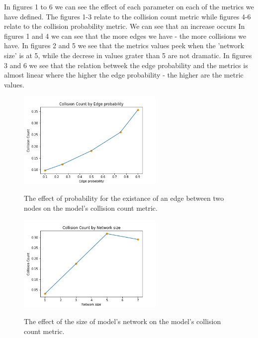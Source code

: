 \documentclass{article}
\begin{document}
In figures 1 to 6 we can see the effect of each parameter on each of the metrics we have defined.
The figures 1-3 relate to the collision count metric while figures 4-6 relate to the collision probability metric.
We can see that an increase occurs In figures 1 and 4 we can see that the more edges we have - the more collisions we have.
In figures 2 and 5 we see that the metrics values peek when the 'network size' is at 5,
while the decrese in values grater than 5 are not dramatic.
In figures 3 and 6 we see that the relation betweek the edge probability and the metrics is almost linear where the
higher the edge probability - the higher are the metric values.

\begin{figure}
    \begin{center}
        \includegraphics[width=7cm]{../figures/Collision_Count_edge_prob.png}\\
        \caption{The effect of probability for the existance of an edge between two nodes on the model's collision count metric.}
    \end{center}
\end{figure}    
\begin{figure}
    \begin{center}
        \includegraphics[width=7cm]{../figures/Collision_Count_network_size.png}\\
        \caption{The effect of the size of model's network on the model's collision count metric.}
    \end{center}
\end{figure}    
\end{document}
